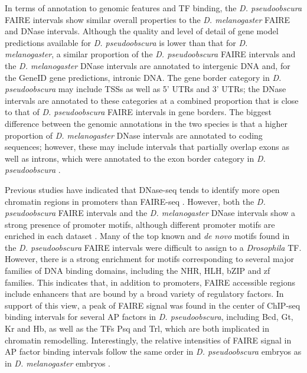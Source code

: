 In terms of annotation to genomic features and TF binding, the \emph{D. pseudoobscura} FAIRE intervals show similar overall properties to the \emph{D. melanogaster} FAIRE and DNase intervals. Although the quality and level of detail of gene model predictions available for \emph{D. pseudoobscura} is lower than that for \emph{D. \\
melanogaster}, a similar proportion of the \emph{D. pseudoobscura} FAIRE intervals and the \emph{D. melanogaster} DNase intervals are annotated to intergenic DNA and, for the GeneID gene predictions, intronic DNA. The gene border category in \emph{D. pseudoobscura} may include TSSs as well as 5' UTRs and 3' UTRs; the DNase intervals are annotated to these categories at a combined proportion that is close to that of \emph{D. pseudoobscura} FAIRE intervals in gene borders. The biggest difference between the genomic annotations in the two species is that a higher proportion of \emph{D. melanogaster} DNase intervals are annotated to coding sequences; however, these may include intervals that partially overlap exons as well as introns, which were annotated to the exon border category in \emph{D. pseudoobscura} \citep{thomas_dynamic_2011}.

Previous studies have indicated that DNase-seq tends to identify more open chromatin regions in promoters than FAIRE-seq \citep{koohy_chromatin_2013}. However, both the \emph{D. pseudoobscura} FAIRE intervals and the \emph{D. melanogaster} DNase intervals show a strong presence of promoter motifs, although different promoter motifs are enriched in each dataset \citep{thomas_dynamic_2011}. Many of the top known and \emph{de novo} motifs found in the \emph{D. pseudoobscura} FAIRE intervals were difficult to assign to a \emph{Drosophila} TF. However, there is a strong enrichment for motifs corresponding to several major families of DNA binding domains, including the NHR, HLH, bZIP and zf families. This indicates that, in addition to promoters, FAIRE accessible regions include enhancers that are bound by a broad variety of regulatory factors. In support of this view, a peak of FAIRE signal was found in the center of ChIP-seq binding intervals for several AP factors in \emph{D. pseudoobscura}, including Bcd, Gt, Kr and Hb, as well as the TFs Psq and Trl, which are both implicated in chromatin remodelling. Interestingly, the relative intensities of FAIRE signal in AP factor binding intervals follow the same order in \emph{D. pseudoobscura} embryos as in \emph{D. melanogaster} embryos \citep{mckay_common_2013}.

